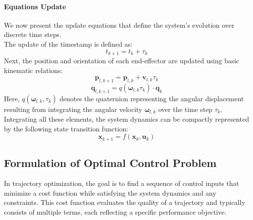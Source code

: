 \documentclass[main.tex]{subfiles}
\begin{document}
\begin{sloppypar}
\paragraph{Equations Update}We now present the update equations that define the system's evolution over discrete time steps. \\ 
The update of the timestamp is defined as:
\begin{equation}
    t_{k+1} = t_k + \tau_k
\end{equation}
Next, the position and orientation of each end-effector are updated using basic kinematic relations:
\begin{equation}
    \mathbf{p}_{l,k+1} = \mathbf{p}_{l,k} + \mathbf{v}_{l,k} \tau_k
\end{equation}
\begin{equation}
    \mathbf{q}_{l,k+1} = \textit{q}(\boldsymbol{\omega}_{l,k} \tau_k) \cdot \mathbf{q}_{k}
\end{equation}
Here, $\textit{q}(\boldsymbol{\omega}_{l,k}, \tau_k)$ denotes the quaternion representing the angular displacement resulting from integrating the angular velocity $\boldsymbol{\omega}_{l,k}$ over the time step $\tau_k$.
Integrating all these elements, the system dynamics can be compactly represented by the following state transition function:
\begin{equation}
    \mathbf{x}_{k+1} = f(\mathbf{x}_k, \mathbf{u}_k)
\end{equation}
\subsection{Formulation of Optimal Control Problem}
In trajectory optimization, the goal is to find a sequence of control inputs that minimize a cost function while satisfying the system dynamics and any constraints. This cost function evaluates the quality of a trajectory and typically consists of multiple terms, each reflecting a specific performance objective.

\end{sloppypar}
\end{document}
